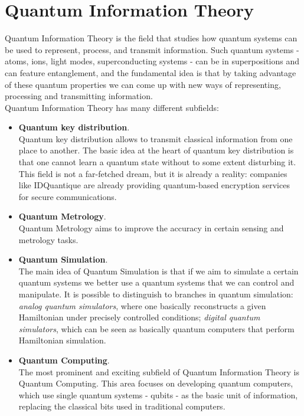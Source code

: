 
\chapter{Quantum Information Theory}

Quantum Information Theory is the field that studies how quantum systems can be used to represent, process, and transmit information.
Such quantum systems - atoms, ions, light modes, superconducting systems - can be in superpositions and can feature entanglement, 
and the fundamental idea is that by taking advantage of these quantum properties we can come up with new ways of representing, processing
and transmitting information.\\
Quantum Information Theory has many different subfields:

\begin{itemize}
    \item \textbf{Quantum key distribution}.\\
    Quantum key distribution allows to transmit classical information from one place to another.
    The basic idea at the heart of quantum key distribution is that one cannot learn a quantum state without to some extent disturbing it.
    This field is not a far-fetched dream, but it is already a reality: companies like IDQuantique are already providing quantum-based encryption 
    services for secure communications.
    \item \textbf{Quantum Metrology}.\\
    Quantum Metrology aims to improve the accuracy in certain sensing and metrology tasks.
    \item \textbf{Quantum Simulation}.\\
    The main idea of Quantum Simulation is that if we aim to simulate a certain quantum systems we better use a quantum systems that we can
    control and manipulate.
    It is possible to distinguish to branches in quantum simulation: \textit{analog quantum simulators}, where
    one basically reconstructs a given Hamiltonian under precisely controlled conditions; \textit{digital quantum simulators}, which can 
    be seen as basically quantum computers that perform Hamiltonian simulation.
    \item \textbf{Quantum Computing}.\\
    The most prominent and exciting subfield of Quantum Information Theory is Quantum Computing. This area focuses on developing quantum computers, 
    which use single quantum systems - qubits - as the basic unit of information, replacing the classical bits used in traditional computers.\\

\end{itemize}
